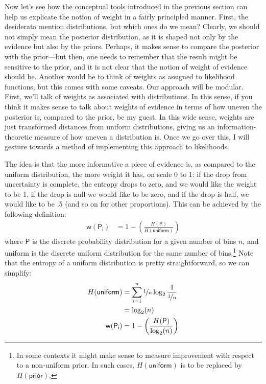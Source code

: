 \documentclass[
  10pt,
  dvipsnames,enabledeprecatedfontcommands]{scrartcl}
\begin{document}
Now let's see how the conceptual tools introduced in the previous
section can help us explicate the notion of weight in a fairly
principled manner. First, the desiderata mention distributions, but
which ones do we mean? Clearly, we should not simply mean the posterior
distribution, as it is shaped not only by the evidence but also by the
priors. Perhaps, it makes sense to compare the posterior with the
prior---but then, one needs to remember that the result might be
sensitive to the prior, and it is not clear that the notion of weight of
evidence should be. Another would be to think of weights as assigned to
likelihood functions, but this comes with some caveats. Our approach
will be modular. First, we'll talk of weights as associated with
distributions. In this sense, if you think it makes sense to talk about
weights of evidence in terms of how uneven the posterior is, compared to
the prior, be my guest. In this wide sense, weights are just transformed
distances from uniform distributions, giving us an information-theoretic
measure of how uneven a distribution is. Once we go over this, I will
gesture towards a method of implementing this approach to likelihoods.

The idea is that the more informative a piece of evidence is, as
compared to the uniform distribution, the more weight it has, on scale 0
to 1: if the drop from uncertainty is complete, the entropy drops to
zero, and we would like the weight to be 1, if the drop is null we would
like to be zero, and if the drop is half, we would like to be .5 (and so
on for other proportions). This can be achieved by the following
definition: \begin{align*}
\mathsf{w(P_i)} & = 1 - \left( \frac{H(\mathsf{P})}{H(\mathsf{uniform})}\right)
\end{align*} \noindent where \(\mathsf{P}\) is the discrete probability
distribution for a given number of bins \(n\), and uniform is the
discrete uniform distribution for the same number of
bins.\footnote{In some contexts it might make sense to measure improvement with respect to a non-uniform prior. In such cases,  $H(\mathsf{uniform})$ is to be replaced by $H(\mathsf{prior})$.}
Note that the entropy of a uniform distribution is pretty
straightforward, so we can simplify: \begin{align*}
H(\mathsf{uniform}) & = \sum_{i=1}^n \nicefrac{1}{n} \log_2 \frac{1}{\nicefrac{1}{n}} \\
& = \log_2(n) \\
\mathsf{w(P_i)} & = 1 - \left( \frac{H(\mathsf{P})}{\log_2(n)}\right)
\end{align*}
\end{document}

